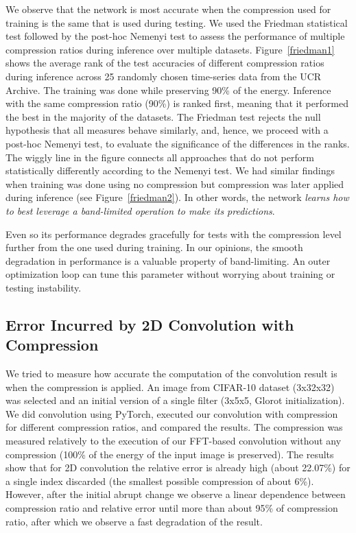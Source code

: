 We observe that the network is most accurate when the compression used for training is the same that is used during testing. We used the Friedman statistical test followed by the post-hoc Nemenyi test to assess the performance of multiple compression ratios during inference over multiple datasets. Figure~\ref{friedman1} shows the average rank of the test accuracies of different compression ratios during inference across 25 randomly chosen time-series data from the UCR Archive. The training was done while preserving 90\% of the energy. Inference with the same compression ratio (90\%) is ranked first, meaning that it performed the best in the majority of the datasets. The Friedman test rejects the null hypothesis that all measures behave similarly, and, hence, we proceed with a post-hoc Nemenyi test, to evaluate the significance of the differences in the ranks. The wiggly line in the figure connects all approaches that do not perform statistically differently according to the Nemenyi test. We had similar findings when training was done using no compression but compression was later applied during inference (see Figure~\ref{friedman2}). In other words, the network \emph{learns how to best leverage a band-limited operation to make its predictions}.
 
 Even so its performance degrades gracefully for tests with the compression level further from the one used during training. 
 In our opinions, the smooth degradation in performance is a valuable property of band-limiting. An outer optimization loop can tune this parameter without worrying about training or testing instability.

\subsection{Error Incurred by 2D Convolution with Compression}
We tried to measure how accurate the computation of the convolution result is when the compression is applied. An image from CIFAR-10 dataset (3x32x32) was selected and an initial version of a single filter (3x5x5, Glorot initialization). We did convolution using PyTorch, executed our convolution with compression for different compression ratios, and compared the results. The compression was measured relatively to the execution of our FFT-based convolution without any compression (100\% of the energy of the input image is preserved). The results show that for 2D convolution the relative error is already high (about 22.07\%) for a single index discarded (the smallest possible compression of about 6\%). However, after the initial abrupt change we observe a linear dependence between compression ratio and relative error until more than about 95\% of compression ratio, after which we observe a fast degradation of the result.


